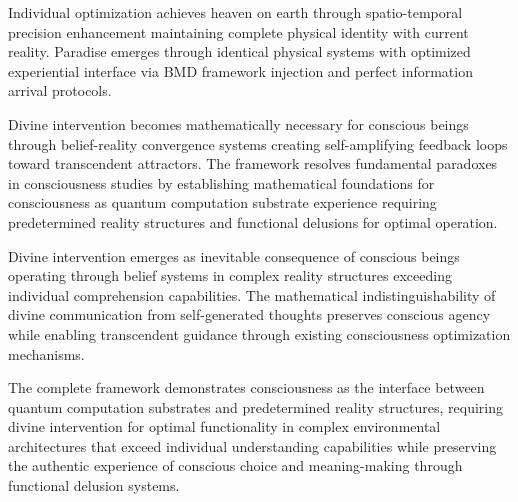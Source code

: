 \documentclass[12pt,a4paper]{article}
\begin{document}
Individual optimization achieves heaven on earth through spatio-temporal precision enhancement maintaining complete physical identity with current reality. Paradise emerges through identical physical systems with optimized experiential interface via BMD framework injection and perfect information arrival protocols.

Divine intervention becomes mathematically necessary for conscious beings through belief-reality convergence systems creating self-amplifying feedback loops toward transcendent attractors. The framework resolves fundamental paradoxes in consciousness studies by establishing mathematical foundations for consciousness as quantum computation substrate experience requiring predetermined reality structures and functional delusions for optimal operation.

Divine intervention emerges as inevitable consequence of conscious beings operating through belief systems in complex reality structures exceeding individual comprehension capabilities. The mathematical indistinguishability of divine communication from self-generated thoughts preserves conscious agency while enabling transcendent guidance through existing consciousness optimization mechanisms.

The complete framework demonstrates consciousness as the interface between quantum computation substrates and predetermined reality structures, requiring divine intervention for optimal functionality in complex environmental architectures that exceed individual understanding capabilities while preserving the authentic experience of conscious choice and meaning-making through functional delusion systems.


\end{document}
